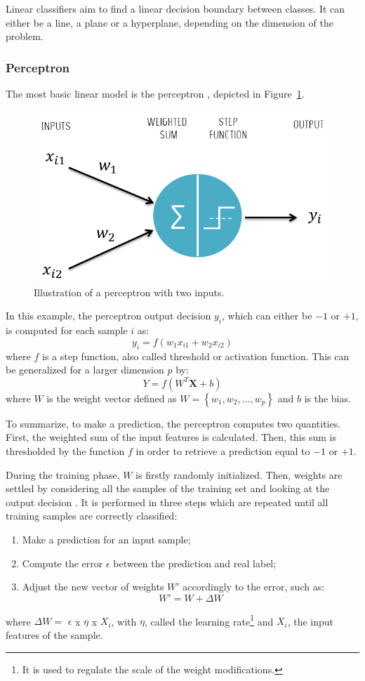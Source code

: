 \documentclass[a4paper,10pt]{article}
\begin{document}
Linear classifiers aim to find a linear decision boundary between classes. It can either be a line, a plane or a hyperplane, depending on the dimension of the problem.

\subsubsection{Perceptron}
The most basic linear model is the perceptron \cite{rosenblatt1958perceptron}, depicted in Figure~\ref{Perceptron}.
\begin{figure}[htbp]
\centerline{\includegraphics[width=0.4\linewidth]{./figures/perceptron.png}}
\caption{Illustration of a perceptron with two inputs.}
\label{Perceptron}
\end{figure}

In this example, the perceptron output decision $y_i$, which can either be $-1$ or $+1$, is computed for each sample $i$ as:
\begin{equation}
y_i = f(w_1x_{i1} + w_2x_{i2})
\end{equation}
where $f$ is a step function, also called threshold or activation function. This can be generalized for a larger dimension $p$ by:
\begin{equation}\label{linearEquation}
Y = f(W^T\bm{X}+b)
\end{equation}
where $W$ is the weight vector defined as $W = \left\{ w_1, w_2, \ldots, w_p \right\}$ and $b$ is the bias.

To summarize, to make a prediction, the perceptron computes two quantities. First, the weighted sum of the input features is calculated. Then, this sum is thresholded by the function $f$ in order to retrieve a prediction equal to $-1$ or $+1$.

During the training phase, $W$ is firstly randomly initialized. Then, weights are settled by considering all the samples of the training set and looking at the output decision \cite{shiffman2012nature}. It is performed in three steps which are repeated until all training samples are correctly classified:
\begin{enumerate}
\item Make a prediction for an input sample;
\item Compute the error $\epsilon$ between the prediction and real label;
\item Adjust the new vector of weights $W'$ accordingly to the error, such as:
\begin{equation}
W' = W + \Delta W
\end{equation}
\end{enumerate}
where $\Delta W =$ $\epsilon$ x $\eta$ x $X_i$, with $\eta$, called the learning rate\footnote{It is used to regulate the scale of the weight modifications.} and $X_i$, the input features of the sample.
\end{document}
